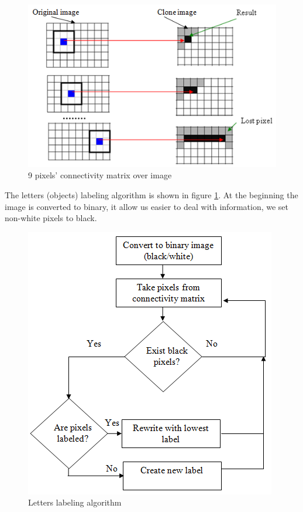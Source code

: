 \begin{figure}[H]
  \centering
  \includegraphics[scale= 0.6]{source/matriximages.png}
  \caption{9 pixels’ connectivity matrix over image}
  \label{fig:matriximages}
\end{figure}

The letters (objects) labeling algorithm is shown in figure \ref{fig:matriximages}. At the beginning the image is converted to binary, it allow us easier to deal with information, we set non-white pixels to black. 

\begin{figure}[H]
  \centering
  \includegraphics[scale= 0.6]{source/labeling.png}
  \caption{Letters labeling algorithm}
  \label{fig:labeling}
\end{figure}

